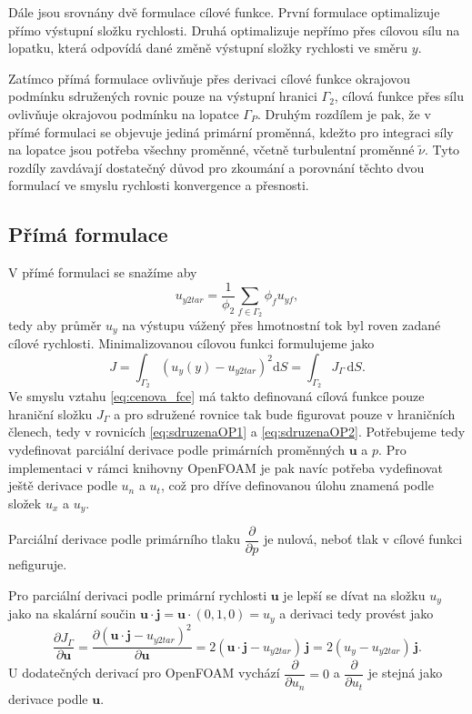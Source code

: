 Dále jsou srovnány dvě formulace cílové funkce. První formulace optimalizuje přímo výstupní složku rychlosti. Druhá optimalizuje nepřímo přes cílovou sílu na lopatku, která odpovídá dané změně výstupní složky rychlosti ve směru $ y $.

Zatímco přímá formulace ovlivňuje přes derivaci cílové funkce okrajovou podmínku sdružených rovnic pouze na výstupní hranici $ \Gamma_2 $, cílová funkce přes sílu ovlivňuje okrajovou podmínku na lopatce $ \Gamma_P $. Druhým rozdílem je pak, že v přímé formulaci se objevuje jediná primární proměnná, kdežto pro integraci síly na lopatce jsou potřeba všechny proměnné, včetně turbulentní proměnné $ \widetilde{\nu} $. Tyto rozdíly zavdávají dostatečný důvod pro zkoumání a porovnání těchto dvou formulací ve smyslu rychlosti konvergence a přesnosti.

\subsection{Přímá formulace}

V přímé formulaci se snažíme aby
\begin{equation}
	u_{y2tar}=\dfrac{1}{\phi_2}\sum_{f\in\Gamma_2}\phi_f u_{yf},
\end{equation}
tedy aby průměr $ u_y $ na výstupu vážený přes hmotnostní tok byl roven zadané cílové rychlosti.
Minimalizovanou cílovou funkci formulujeme jako
\begin{equation}\label{eq:J_UyTarget}
	J = \int_{\Gamma_2}\left( u_y(y)-u_{y2tar} \right)^2\mathrm{d}S = \int_{\Gamma_2} J_\Gamma\, \mathrm{d}S.
\end{equation}
Ve smyslu vztahu \ref{eq:cenova_fce} má takto definovaná cílová funkce pouze hraniční složku $ J_\Gamma $ a pro sdružené rovnice tak bude figurovat pouze v hraničních členech, tedy v rovnicích \ref{eq:sdruzenaOP1} a \ref{eq:sdruzenaOP2}. Potřebujeme tedy vydefinovat parciální derivace podle primárních proměnných $ \mathbf{u} $ a $ p $. Pro implementaci v rámci knihovny OpenFOAM je pak navíc potřeba vydefinovat ještě derivace podle $ u_n $ a $ u_t $, což pro dříve definovanou úlohu znamená podle složek $ u_x $ a $ u_y $.

Parciální derivace podle primárního tlaku $ \dfrac{\partial}{\partial p} $ je nulová, neboť tlak v cílové funkci nefiguruje.

Pro parciální derivaci podle primární rychlosti $ \mathbf{u} $ je lepší se dívat na složku $ u_y $ jako na skalární součin $ \mathbf{u}\cdot \mathbf{j}=\mathbf{u}\cdot (0,1,0) = u_y$ a derivaci tedy provést jako
\begin{equation}
\dfrac{\partial J_\Gamma}{\partial \mathbf{u}}
=
\dfrac{\partial \left( \mathbf{u}\cdot \mathbf{j}-u_{y2tar} \right)^2}{\partial \mathbf{u}}
=
2( \mathbf{u}\cdot \mathbf{j}-u_{y2tar} )\,\mathbf{j}
=
2( u_y-u_{y2tar} )\,\mathbf{j}.
\end{equation}
U dodatečných derivací pro OpenFOAM vychází $ \dfrac{\partial}{\partial u_n}=0 $ a $ \dfrac{\partial }{\partial u_t} $ je stejná jako derivace podle $ \mathbf{u} $.

